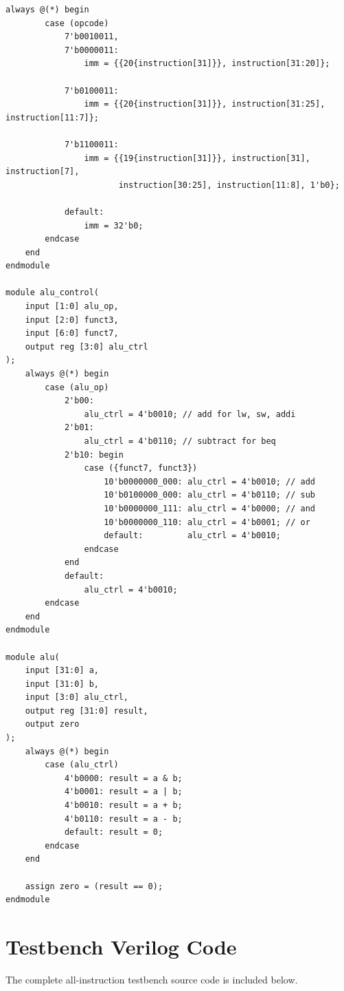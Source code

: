 \documentclass[conference]{IEEEtran}
\begin{document}
\begin{lstlisting}[caption={Complete processor.v source code},label={lst:processor}]
    always @(*) begin
        case (opcode)
            7'b0010011,
            7'b0000011:
                imm = {{20{instruction[31]}}, instruction[31:20]};

            7'b0100011:
                imm = {{20{instruction[31]}}, instruction[31:25], instruction[11:7]};

            7'b1100011:
                imm = {{19{instruction[31]}}, instruction[31], instruction[7],
                       instruction[30:25], instruction[11:8], 1'b0};

            default:
                imm = 32'b0;
        endcase
    end
endmodule

module alu_control(
    input [1:0] alu_op,
    input [2:0] funct3,
    input [6:0] funct7,
    output reg [3:0] alu_ctrl
);
    always @(*) begin
        case (alu_op)
            2'b00:
                alu_ctrl = 4'b0010; // add for lw, sw, addi
            2'b01:
                alu_ctrl = 4'b0110; // subtract for beq
            2'b10: begin
                case ({funct7, funct3})
                    10'b0000000_000: alu_ctrl = 4'b0010; // add
                    10'b0100000_000: alu_ctrl = 4'b0110; // sub
                    10'b0000000_111: alu_ctrl = 4'b0000; // and
                    10'b0000000_110: alu_ctrl = 4'b0001; // or
                    default:         alu_ctrl = 4'b0010;
                endcase
            end
            default:
                alu_ctrl = 4'b0010;
        endcase
    end
endmodule

module alu(
    input [31:0] a,
    input [31:0] b,
    input [3:0] alu_ctrl,
    output reg [31:0] result,
    output zero
);
    always @(*) begin
        case (alu_ctrl)
            4'b0000: result = a & b;
            4'b0001: result = a | b;
            4'b0010: result = a + b;
            4'b0110: result = a - b;
            default: result = 0;
        endcase
    end

    assign zero = (result == 0);
endmodule
\end{lstlisting}

\section{Testbench Verilog Code}
The complete all-instruction testbench source code is included below.
\end{document}
